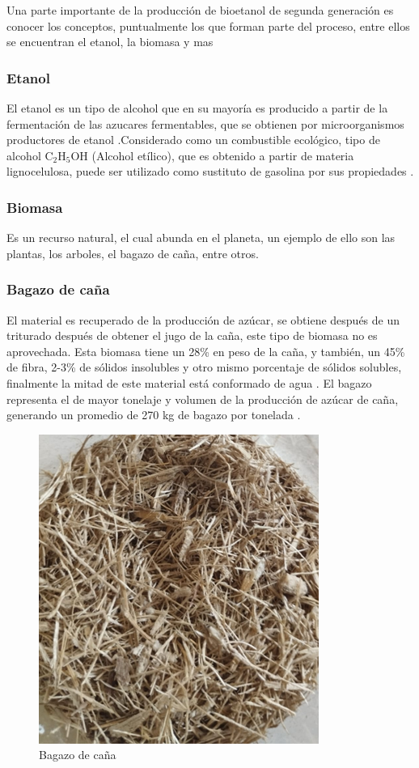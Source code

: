\documentclass[12pt]{article}
\begin{document}
		
		
		Una parte  importante de la producción de bioetanol de segunda generación es conocer los conceptos, puntualmente los que forman parte del proceso, entre ellos se encuentran el etanol, la biomasa y mas 
		\subsubsection{Etanol}
		El etanol es un tipo de alcohol que en su mayoría es producido a partir de la  fermentación de las azucares fermentables, que se obtienen por microorganismos productores de etanol \cite{GONZALEZ2019Pretratamiento} .Considerado como un combustible ecológico, tipo de alcohol $\text{C}_2\text{H}_5\text{OH}$ (Alcohol etílico), que es obtenido a partir de materia lignocelulosa, puede ser utilizado como sustituto de gasolina por sus propiedades \cite{Ballesteros2002proceso}.
		
		\subsubsection{Biomasa}
	Es un recurso natural, el cual abunda en el planeta, un ejemplo de ello son las plantas, los arboles, el bagazo de caña, entre otros.
		
		\subsubsection{Bagazo de caña}
		El material es recuperado de la producción de azúcar, se obtiene después de un triturado después de obtener el jugo de la caña, este tipo de biomasa no es aprovechada. Esta biomasa tiene un 28\% en peso de la caña, y también, un 45\% de fibra, 2-3\% de sólidos insolubles y otro mismo porcentaje de sólidos solubles, finalmente la mitad de este material está conformado de agua \cite{olmo2015bagazo}.
		El bagazo representa el de mayor tonelaje y volumen de la producción de azúcar de caña, generando un promedio de 270 kg de bagazo por tonelada \cite{perez2022efecto}.
		
		\begin{figure}[h]
			\centering
			\includegraphics[width=0.4\linewidth]{imagenes/bagazo}
			\caption[Bagazo de caña]{Bagazo de caña}
			\label{fig:bagazo}
		\end{figure}
		
\end{document}
